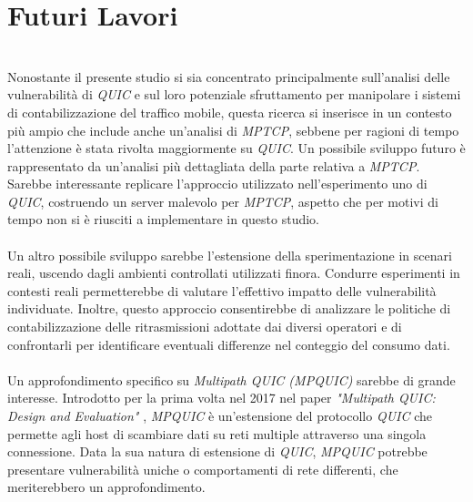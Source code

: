 \section{Futuri Lavori}
~\\
\indent Nonostante il presente studio si sia concentrato principalmente sull'analisi delle vulnerabilità di \emph{QUIC} e sul loro potenziale sfruttamento per manipolare i sistemi di contabilizzazione del traffico mobile, questa ricerca si inserisce in un contesto più ampio che include anche un'analisi di \emph{MPTCP}, 
sebbene per ragioni di tempo l'attenzione è stata rivolta maggiormente su \emph{QUIC}. Un possibile sviluppo futuro è rappresentato da un'analisi più dettagliata della parte relativa a \emph{MPTCP}.
Sarebbe interessante replicare l'approccio utilizzato nell'esperimento uno di \emph{QUIC}, costruendo un server malevolo per \emph{MPTCP}, aspetto che per motivi di tempo non si è riusciti a implementare in questo studio.
\\\\
Un altro possibile sviluppo sarebbe l'estensione della sperimentazione in scenari reali, uscendo dagli ambienti controllati utilizzati finora. 
Condurre esperimenti in contesti reali permetterebbe di valutare l'effettivo impatto delle vulnerabilità individuate. 
Inoltre, questo approccio consentirebbe di analizzare le politiche di contabilizzazione delle ritrasmissioni adottate dai diversi operatori 
e di confrontarli per identificare eventuali differenze nel conteggio del consumo dati.
\\\\
Un approfondimento specifico su \emph{Multipath QUIC (MPQUIC)} sarebbe di grande interesse. 
Introdotto per la prima volta nel 2017 nel paper \emph{"Multipath QUIC: Design and Evaluation"} \cite{article:mpquic},
\emph{MPQUIC} è un'estensione del protocollo \emph{QUIC} che permette agli host di scambiare dati su reti multiple attraverso una singola connessione.
Data la sua natura di estensione di \emph{QUIC},
\emph{MPQUIC} potrebbe presentare vulnerabilità uniche o comportamenti di rete differenti, che meriterebbero un approfondimento.
